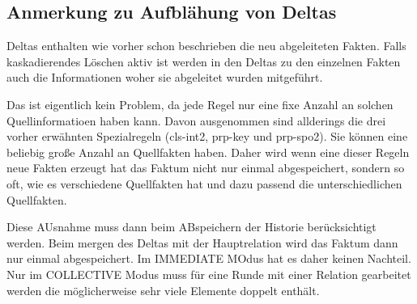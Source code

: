 \subsection{Anmerkung zu Aufblähung von Deltas}
\label{abschnitt-aufblaehung}
Deltas enthalten wie vorher schon beschrieben die neu abgeleiteten Fakten. Falls kaskadierendes Löschen aktiv ist werden in den Deltas zu den einzelnen Fakten auch die Informationen woher sie abgeleitet wurden mitgeführt.

Das ist eigentlich kein Problem, da jede Regel nur eine fixe Anzahl an solchen Quellinformatioen haben kann. Davon ausgenommen sind allderings die drei vorher erwähnten Spezialregeln (cls-int2, prp-key und prp-spo2). Sie können eine beliebig große Anzahl an Quellfakten haben. Daher wird wenn eine dieser Regeln neue Fakten erzeugt hat das Faktum nicht nur einmal abgespeichert, sondern so oft, wie es verschiedene Quellfakten hat und dazu passend die unterschiedlichen Quellfakten.

Diese AUsnahme muss dann beim ABspeichern der Historie berücksichtigt werden. Beim mergen des Deltas mit der Hauptrelation wird das Faktum dann nur einmal abgespeichert. Im IMMEDIATE MOdus hat es daher keinen Nachteil. Nur im COLLECTIVE Modus muss für eine Runde mit einer Relation gearbeitet werden die möglicherweise sehr viele Elemente doppelt enthält.